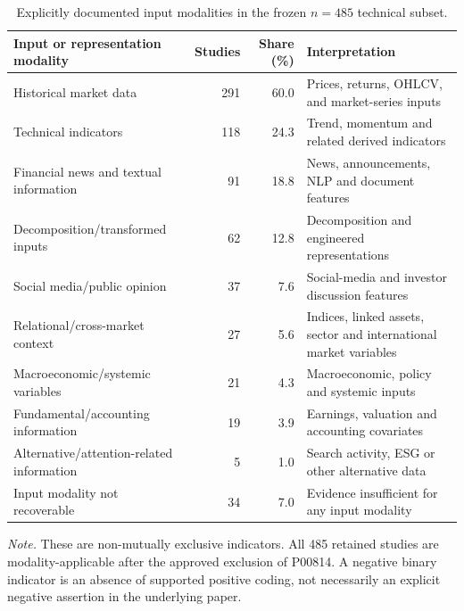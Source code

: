 \documentclass[pdflatex,sn-mathphys-num]{sn-jnl}%
\theoremstyle{thmstyleone}%
\theoremstyle{thmstyletwo}%
\theoremstyle{thmstylethree}%
\begin{document}
\begin{table}[!t]
\centering
\caption{Explicitly documented input modalities in the frozen $n=485$ technical subset.}
\label{tab:input-modalities}
\footnotesize
\setlength{\tabcolsep}{3.5pt}
\renewcommand{\arraystretch}{1.12}
\begin{tabularx}{\textwidth}{@{}>{\RaggedRight\arraybackslash}p{4cm}rr>{\RaggedRight\arraybackslash}X@{}}
\toprule
Input or representation modality & Studies & Share (\%) & Interpretation \\
\midrule
Historical market data & 291 & 60.0 & Prices, returns, OHLCV, and market-series inputs \\
Technical indicators & 118 & 24.3 & Trend, momentum and related derived indicators \\
Financial news and textual information & 91 & 18.8 & News, announcements, NLP and document features \\
Decomposition/transformed inputs & 62 & 12.8 & Decomposition and engineered representations \\
Social media/public opinion & 37 & 7.6 & Social-media and investor discussion features \\
Relational/cross-market context & 27 & 5.6 & Indices, linked assets, sector and international market variables \\
Macroeconomic/systemic variables & 21 & 4.3 & Macroeconomic, policy and systemic inputs \\
Fundamental/accounting information & 19 & 3.9 & Earnings, valuation and accounting covariates \\
Alternative/attention-related information & 5 & 1.0 & Search activity, ESG or other alternative data \\
Input modality not recoverable & 34 & 7.0 & Evidence insufficient for any input modality \\
\bottomrule
\end{tabularx}
\vspace{1mm}
\begin{minipage}{0.97\textwidth}\footnotesize
\textit{Note.} These are non-mutually exclusive indicators. All 485 retained
studies are modality-applicable after the approved exclusion of P00814.
A negative binary indicator is an absence of supported positive coding,
not necessarily an explicit negative assertion in the underlying paper.
\end{minipage}
\end{table}

\FloatBarrier
\end{document}
